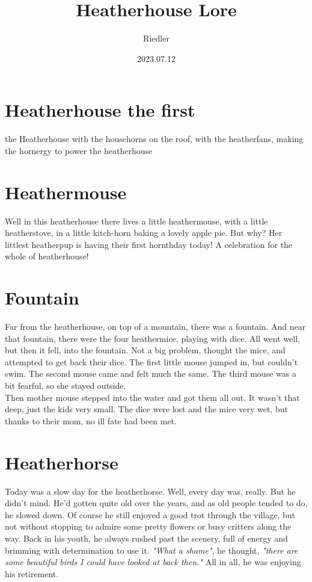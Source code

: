 \documentclass[11pt]{article}
\title{\textbf{Heatherhouse Lore}}
\author{Riedler}
\date{2023.07.12}
\begin{document}
\maketitle

\section*{Heatherhouse the first}

the Heatherhouse with the househorns on the roof, with the heatherfans, making the hornergy to power the heatherhouse

\section*{Heathermouse}

Well in this heatherhouse there lives a little heathermouse, with a little heatherstove, in a little kitch-horn baking a lovely apple pie. But why? Her littlest heatherpup is having their first hornthday today! A celebration for the whole of heatherhouse!

\section*{Fountain}

Far from the heatherhouse, on top of a mountain, there was a fountain. And near that fountain, there were the four heathermice, playing with dice. All went well, but then it fell, into the fountain.
Not a big problem, thought the mice, and attempted to get back their dice. The first little mouse jumped in, but couldn't swim. The second mouse came and felt much the same. The third mouse was a bit fearful, so she stayed outside.\\
Then mother mouse stepped into the water and got them all out. It wasn't that deep, just the kids very small. The dice were lost and the mice very wet, but thanks to their mom, no ill fate had been met.

\section*{Heatherhorse}

Today was a slow day for the heatherhorse. Well, every day was, really. But he didn't mind. He'd gotten quite old over the years, and as old people tended to do, he slowed down. Of course he still enjoyed a good trot through the village, but not without stopping to admire some pretty flowers or busy critters along the way. Back in his youth, he always rushed past the scenery, full of energy and brimming with determination to use it. \emph{"What a shame"}, he thought, \emph{"there are some beautiful birds I could have looked at back then."} All in all, he was enjoying his retirement.
\end{document}
